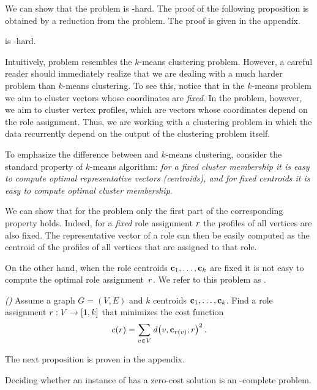 We can show that the \prbrm problem is  \np-hard.
The proof of the following proposition is obtained 
by a reduction from the \tmatch problem.
The proof is given in the appendix.

\begin{proposition}
\label{proposition:np}
\prbrm is \np-hard.
\end{proposition}

Intuitively, problem \prbrm resembles the $k$-means clustering problem.
However, a careful reader should immediately realize
that we are dealing with a much harder problem than $k$-means clustering.
To see this, notice that in the $k$-means problem 
we aim to cluster vectors whose coordinates are \emph{fixed}. 
In the \prbrm problem, however, we aim to cluster vertex profiles,
which are vectors whose coordinates depend on the role assignment.
Thus, we are working with a clustering problem
in which the data recurrently depend on the output of the clustering problem itself.

To emphasize the difference between \prbrm and $k$-means clustering, 
consider the standard property of $k$-means algorithm:
\emph{for a fixed cluster membership it is easy to compute optimal representative vectors (centroids), 
and for fixed centroids it is easy to compute optimal cluster membership}. 

We can show that for the \prbrm problem
only the first part of the corresponding property holds.
Indeed, for a \emph{fixed} role assignment $r$
the profiles of all vertices are also fixed.
The representative vector of a role
can then be easily computed as the centroid
of the profiles of all vertices that are assigned to that role. 

On the other hand, 
when the role centroids $\mathbf{c}_1, \ldots, \mathbf{c}_k$ are fixed
it is not easy to compute the optimal role assignment~$r$.
We refer to this problem as \prbrmfixed.

\begin{problem} 
\label{problem:role-mining-fixed}
\emph{(\prbrmfixed)}
Assume a graph $G = (V, E)$ %
and $k$ centroids $\mathbf{c}_1, \ldots, \mathbf{c}_k$.
Find a role assignment ${r}:{V} \to {[1, k]}$ 
that minimizes the cost function
\[
\cost{\role} = 
\sum_{v \in V} \dist{v, \centroid_{\role(v)}; \role}^2.
\]
\end{problem}

The next proposition is proven in the appendix.

\begin{proposition}
\label{proposition:np-fixed}
Deciding whether an instance of \prbrmfixed has a zero-cost solution 
is an \np-complete problem. 
\end{proposition}

